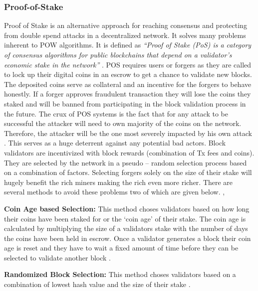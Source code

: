\subsubsection{Proof-of-Stake} \label{PS}
Proof of Stake is an alternative approach for reaching consensus and protecting from double spend attacks in a decentralized network. It solves many problems inherent to POW algorithms. It is defined as \textit{“Proof of Stake (PoS) is a category of consensus algorithms for public blockchains that depend on a validator's economic stake in the network”} \cite{ethwiki:006}. POS requires users or forgers as they are called to lock up their digital coins in an escrow to get a chance to validate new blocks. The deposited coins serve as collateral and an incentive for the forgers to behave honestly. If a forger approves fraudulent transaction they will lose the coins they staked and will be banned from participating in the block validation process in the future. The crux of POS systems is the fact that for any attack to be successful the attacker will need to own majority of the coins on the network. Therefore, the attacker will be the one most severely impacted by his own attack \cite{bitwiki:005}. This serves as a huge deterrent against any potential bad actors. Block validators are incentivized with block rewards (combination of Tx fees and coins). They are selected by the network in a pseudo – random selection process based on a combination of factors. Selecting forgers solely on the size of their stake will hugely benefit the rich miners making the rich even more richer. There are several methods to avoid these problems two of which are given below. \cite{medium:002}, \cite{misc:001}

\textbf{Coin Age based Selection:}
This method choses validators based on how long their coins have been staked for or the ‘coin age’ of their stake. The coin age is calculated by multiplying the size of a validators stake with the number of days the coins have been held in escrow. Once a validator generates a block their coin age is reset and they have to wait a fixed amount of time before they can be selected to validate another block \cite{misc:001}.

\textbf{Randomized Block Selection:}
This method choses validators based on a combination of lowest hash value and the size of their stake \cite{misc:001}.

